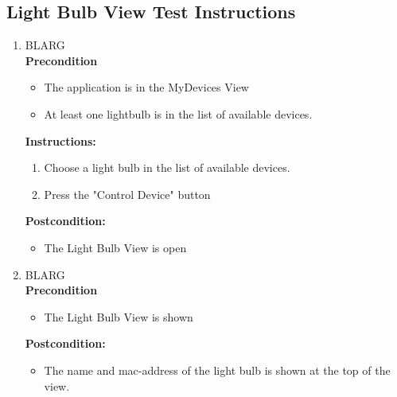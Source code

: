 \documentclass[a4paper]{article}
\newlength{\testlabellength}
\newenvironment{testlist}{\begin{enumerate}[label=\bfseries Instruction \thesubsection.\arabic* , labelindent=0pt, labelwidth=\testlabellength , leftmargin=2cm]}{\end{enumerate}}
\newenvironment{precondition}{
{\color{white}BLARG}\\ 
\textbf{Precondition}
\begin{itemize}[labelindent=0cm, labelwidth=2cm , leftmargin=1cm]
}
{\end{itemize}}
\newenvironment{instruction}{
\textbf{Instructions:}
\begin{enumerate}[label=\bfseries  \arabic*., labelindent=0cm, labelwidth=2cm , leftmargin=1cm]
}
{\end{enumerate}}
\newenvironment{postcondition}{
\textbf{Postcondition:}
\begin{itemize}[labelindent=0cm, labelwidth=2cm , leftmargin=1cm]
}
{\end{itemize}}
\begin{document}
\begin{appendices}
\begin{testlist}
\end{testlist}

\subsection{Light Bulb View Test Instructions}
\begin{testlist}

    \item
    	\begin{precondition}
    		\item The application is in the MyDevices View
    		\item At least one lightbulb is in the list of available devices.
    	\end{precondition}
    	\begin{instruction}
    			\item Choose a light bulb in the list of available devices.
    			\item Press the "Control Device" button
    	\end{instruction}
    	\begin{postcondition}
    		\item The Light Bulb View is open
    	\end{postcondition}

	
	\item
		\begin{precondition}
			\item The Light Bulb View is shown
		\end{precondition}
    	\begin{postcondition}
    		\item The name and mac-address of the light bulb is shown at the top of the view.
    	\end{postcondition}
    	
	

\end{testlist}
\end{appendices}
\end{document}
